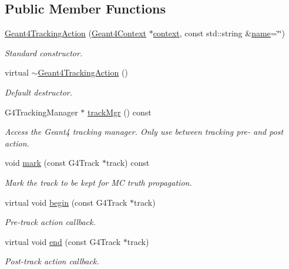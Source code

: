 \subsection*{Public Member Functions}
\begin{DoxyCompactItemize}
\item 
\hyperlink{class_d_d4hep_1_1_simulation_1_1_geant4_tracking_action_a880f505879b9b751f5757147b79823ce}{Geant4\+Tracking\+Action} (\hyperlink{class_d_d4hep_1_1_simulation_1_1_geant4_context}{Geant4\+Context} $\ast$\hyperlink{class_d_d4hep_1_1_simulation_1_1_geant4_action_aa9d87f0ec2a72b7fc2591b18f98d75cf}{context}, const std\+::string \&\hyperlink{class_d_d4hep_1_1_simulation_1_1_geant4_action_af374e70b014d16afb81dd9d77cc3894b}{name}=\char`\"{}\char`\"{})
\begin{DoxyCompactList}\small\item\em Standard constructor. \end{DoxyCompactList}\item 
virtual \hyperlink{class_d_d4hep_1_1_simulation_1_1_geant4_tracking_action_a2647e6b8f311448fa99c20c487df3782}{$\sim$\+Geant4\+Tracking\+Action} ()
\begin{DoxyCompactList}\small\item\em Default destructor. \end{DoxyCompactList}\item 
G4\+Tracking\+Manager $\ast$ \hyperlink{class_d_d4hep_1_1_simulation_1_1_geant4_tracking_action_ab895bd9c26b30b749fab7a8bdf9351cc}{track\+Mgr} () const
\begin{DoxyCompactList}\small\item\em Access the Geant4 tracking manager. Only use between tracking pre-\/ and post action. \end{DoxyCompactList}\item 
void \hyperlink{class_d_d4hep_1_1_simulation_1_1_geant4_tracking_action_abbd91189fe749f8b8cf5224d365bbcb0}{mark} (const G4\+Track $\ast$track) const
\begin{DoxyCompactList}\small\item\em Mark the track to be kept for MC truth propagation. \end{DoxyCompactList}\item 
virtual void \hyperlink{class_d_d4hep_1_1_simulation_1_1_geant4_tracking_action_a65858867a7b71bf4f48b9f140bc9a88d}{begin} (const G4\+Track $\ast$track)
\begin{DoxyCompactList}\small\item\em Pre-\/track action callback. \end{DoxyCompactList}\item 
virtual void \hyperlink{class_d_d4hep_1_1_simulation_1_1_geant4_tracking_action_a29f980c180576781771ea325b4a73f14}{end} (const G4\+Track $\ast$track)
\begin{DoxyCompactList}\small\item\em Post-\/track action callback. \end{DoxyCompactList}\end{DoxyCompactItemize}
